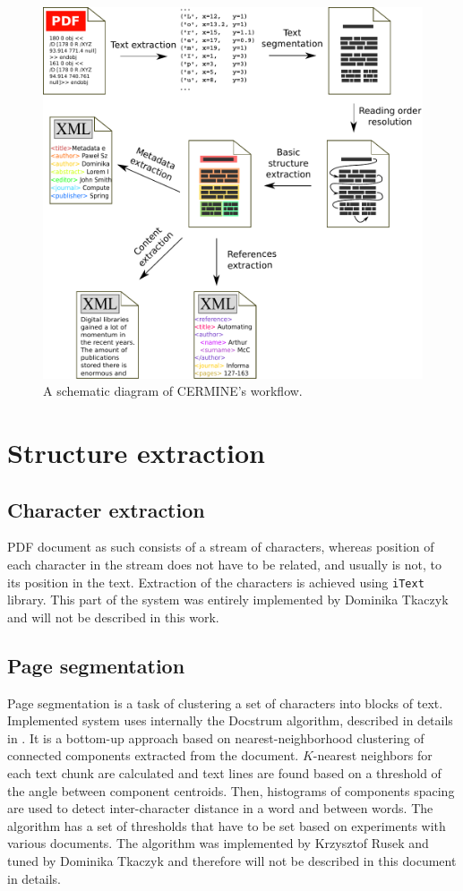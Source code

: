 \begin{figure}[ht!]
  \centering
  \includegraphics[width=14cm]{graphics/pipeline}
  \caption{A schematic diagram of CERMINE's workflow.}
  \label{fig:pipeline}
\end{figure}

\section{Structure extraction}
\subsection{Character extraction}\label{sec:character_extraction}
PDF document as such consists of a stream of characters, whereas position of each character in the stream does not have to be related, and usually is not, to its position in the text. Extraction of the characters is achieved using \verb+iText+ library. This part of the system was entirely implemented by Dominika Tkaczyk and will not be described in this work.

\subsection{Page segmentation}\label{sec:page_segmentation}
Page segmentation is a task of clustering a set of characters into blocks of text. Implemented system uses internally the Docstrum algorithm, described in details in \cite{O'Gorman1993}. It is a bottom-up approach based on nearest-neighborhood clustering of connected components extracted from the document. $K$-nearest neighbors for each text chunk are calculated and text lines are found based on a threshold of the angle between component centroids. Then, histograms of components spacing are used to detect inter-character distance in a word and between words. The algorithm has a set of thresholds that have to be set based on experiments with various documents. The algorithm was implemented by Krzysztof Rusek and tuned by Dominika Tkaczyk and therefore will not be described in this document in details.

